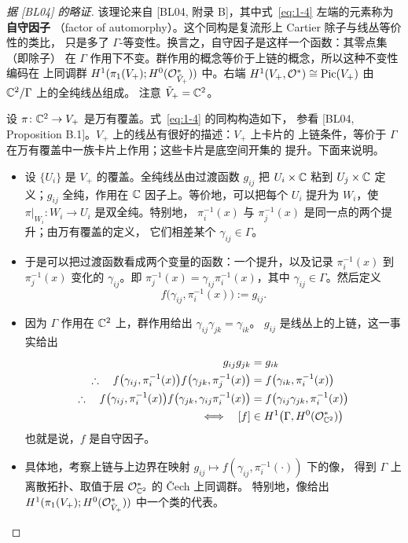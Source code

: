 \begin{proof}[{据 [BL04] 的略证}]
该理论来自 [BL04, 附录 B]，其中式~\eqref{eq:1-4} 左端的元素称为\textbf{自守因子}
（factor of automorphy）。这个同构是复流形上 Cartier 除子与线丛等价性的类比，
只是多了 $\Gamma$-等变性。换言之，自守因子是这样一个函数：其零点集（即除子）
在 $\Gamma$ 作用下不变。群作用的概念等价于上链的概念，所以这种不变性编码在
上同调群 $H^1(\pi_1(V_+);H^0(\mathcal{O}^*_{\tilde V_+}))$ 中。右端
$H^1(V_+,\mathcal{O}^*)\cong\mathrm{Pic}(V_+)$ 由 $\mathbb{C}^2/\Gamma$ 上的全纯线丛组成。
注意 $\tilde V_+=\mathbb{C}^2$。

设 $\pi\colon\mathbb{C}^2\to V_+$ 是万有覆盖。式~\eqref{eq:1-4} 的同构构造如下，
参看 [BL04, Proposition B.1]。$V_+$ 上的线丛有很好的描述：$V_+$ 上卡片的
上链条件，等价于 $\Gamma$ 在万有覆盖中一族卡片上作用；这些卡片是底空间开集的
提升。下面来说明。
\begin{itemize}[leftmargin=2.2em,itemsep=0.25em]
\item 设 $\{U_i\}$ 是 $V_+$ 的覆盖。全纯线丛由过渡函数 $g_{ij}$ 把 $U_i\times\mathbb{C}$
  粘到 $U_j\times\mathbb{C}$ 定义；$g_{ij}$ 全纯，作用在 $\mathbb{C}$ 因子上。等价地，可以把每个
  $U_i$ 提升为 $W_i$，使 $\pi|_{W_i}\colon W_i\to U_i$ 是双全纯。特别地，
  $\pi_i^{-1}(x)$ 与 $\pi_j^{-1}(x)$ 是同一点的两个提升；由万有覆盖的定义，
  它们相差某个 $\gamma_{ij}\in\Gamma$。
\item 于是可以把过渡函数看成两个变量的函数：一个提升，以及记录
  $\pi_i^{-1}(x)$ 到 $\pi_j^{-1}(x)$ 变化的 $\gamma_{ij}$。即
  $\pi_j^{-1}(x)=\gamma_{ij}\pi_i^{-1}(x)$，其中 $\gamma_{ij}\in\Gamma$。然后定义
  \[
  f\bigl(\gamma_{ij},\pi_i^{-1}(x)\bigr) := g_{ij}.
  \]
\item 因为 $\Gamma$ 作用在 $\mathbb{C}^2$ 上，群作用给出 $\gamma_{ij}\gamma_{jk}=\gamma_{ik}$。
  $g_{ij}$ 是线丛上的上链，这一事实给出
  \begin{equation}\label{eq:1-5}
  \begin{aligned}
  g_{ij}g_{jk} &= g_{ik}\\
  \therefore\quad f\bigl(\gamma_{ij},\pi_i^{-1}(x)\bigr)
    f\bigl(\gamma_{jk},\pi_j^{-1}(x)\bigr)
    &= f\bigl(\gamma_{ik},\pi_i^{-1}(x)\bigr)\\
  \therefore\quad f\bigl(\gamma_{ij},\pi_i^{-1}(x)\bigr)
    f\bigl(\gamma_{jk},\gamma_{ij}\pi_i^{-1}(x)\bigr)
    &= f\bigl(\gamma_{ij}\gamma_{jk},\pi_i^{-1}(x)\bigr)\\
  \Longleftrightarrow\quad [f] &\in H^1\bigl(\Gamma,H^0(\mathcal{O}^*_{\mathbb{C}^2})\bigr)
  \end{aligned}
  \end{equation}
  也就是说，$f$ 是自守因子。
\item 具体地，考察上链与上边界在映射
  $g_{ij}\mapsto f(\gamma_{ij},\pi_i^{-1}(\cdot))$ 下的像，
  得到 $\Gamma$ 上离散拓扑、取值于层 $\mathcal{O}^*_{\mathbb{C}^2}$ 的 \v{C}ech 上同调群。
  特别地，像给出 $H^1(\pi_1(V_+);H^0(\mathcal{O}^*_{\tilde V_+}))$ 中一个类的代表。
\end{itemize}
\end{proof}

